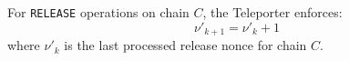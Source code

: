 \begin{property}
\label{prop:seq-nonce}
For \texttt{RELEASE} operations on chain $C$, the Teleporter enforces:
\begin{equation}
  \nu'_{k+1} = \nu'_k + 1
\end{equation}
where $\nu'_k$ is the last processed release nonce for chain $C$.
\end{property}

